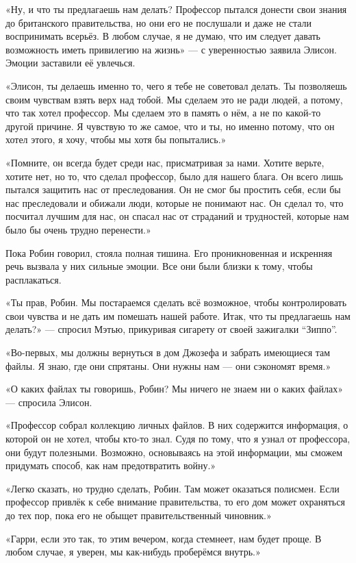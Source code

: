 \documentclass[a5paper, 9pt,
final, openany, twoside=true]{memoir}
\begin{document}
«Ну, и что ты предлагаешь нам делать? Профессор пытался донести свои знания до британского правительства, но они его не послушали и даже не стали воспринимать всерьёз. В любом случае, я не думаю, что им следует давать возможность иметь привилегию на жизнь» — с уверенностью заявила Элисон. Эмоции заставили её увлечься.

«Элисон, ты делаешь именно то, чего я тебе не советовал делать. Ты позволяешь своим чувствам взять верх над тобой. Мы сделаем это не ради людей, а потому, что так хотел профессор. Мы сделаем это в память о нём, а не по какой-то другой причине. Я чувствую то же самое, что и ты, но именно потому, что он хотел этого, я хочу, чтобы мы хотя бы попытались.»

«Помните, он всегда будет среди нас, присматривая за нами. Хотите верьте, хотите нет, но то, что сделал профессор, было для нашего блага. Он всего лишь пытался защитить нас от преследования. Он не смог бы простить себя, если бы нас преследовали и обижали люди, которые не понимают нас. Он сделал то, что посчитал лучшим для нас, он спасал нас от страданий и трудностей, которые нам было бы очень трудно перенести.»

Пока Робин говорил, стояла полная тишина. Его проникновенная и искренняя речь вызвала у них сильные эмоции. Все они были близки к тому, чтобы расплакаться.

«Ты прав, Робин. Мы постараемся сделать всё возможное, чтобы контролировать свои чувства и не дать им помешать нашей работе. Итак, что ты предлагаешь нам делать?» — спросил Мэтью, прикуривая сигарету от своей зажигалки ``Зиппо''.

«Во-первых, мы должны вернуться в дом Джозефа и забрать имеющиеся там файлы. Я знаю, где они спрятаны. Они нужны нам — они сэкономят время.»

«О каких файлах ты говоришь, Робин? Мы ничего не знаем ни о каких файлах» — спросила Элисон.

«Профессор собрал коллекцию личных файлов. В них содержится информация, о которой он не хотел, чтобы кто-то знал. Судя по тому, что я узнал от профессора, они будут полезными. Возможно, основываясь на этой информации, мы сможем придумать способ, как нам предотвратить войну.»

«Легко сказать, но трудно сделать, Робин. Там может оказаться полисмен. Если профессор привлёк к себе внимание правительства, то его дом может охраняться до тех пор, пока его не обыщет правительственный чиновник.»

«Гарри, если это так, то этим вечером, когда стемнеет, нам будет проще. В любом случае, я уверен, мы как-нибудь проберёмся внутрь.»
\end{document}
